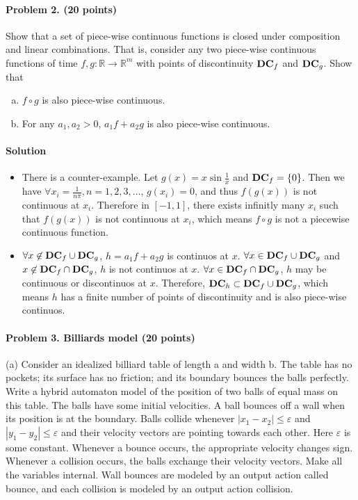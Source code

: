 \documentclass[11pt]{article}
\newcommand{\reals}[0]{\mathbb{R}}
\begin{document}
\paragraph{Problem 2. (20 points)}
Show that a set of piece-wise continuous functions is closed under composition and linear combinations. That is, consider any two piece-wise continuous functions of time $f, g: \reals \rightarrow \reals^m$ with points of discontinuity ${\bf DC}_f$ and ${\bf DC}_g$. Show that
\begin{enumerate}[(a)]
\item $f \circ g$ is also piece-wise continuous.
\item For any $a_1, a_2 >0$, $a_1  f + a_2 g$ is also piece-wise continuous.
\end{enumerate}

\paragraph{Solution}
\begin{itemize}[(a)]
\item
There is a counter-example. Let $g(x) = x \sin \frac{1}{x}$ and ${\bf DC}_f = \{0\}$. Then we have $\forall x_i = \frac{1}{n\pi}, n = 1,2,3,\ldots$, $g(x_i) = 0$, and thus $f(g(x))$ is not continuous at $x_i$. Therefore in $[-1, 1]$, there exists infinitly many $x_i$ such that $f(g(x))$ is not continuous at $x_i$, which means $f \circ g$ is not a piecewise continuous function.
\item
$\forall x \not\in {\bf DC}_f \cup {\bf DC}_g$, $h = a_1  f + a_2 g$ is continuos at $x$. $\forall x \in {\bf DC}_f \cup {\bf DC}_g$ and $x \not\in {\bf DC}_f \cap {\bf DC}_g$, $h$ is not continuos at $x$. $\forall x \in {\bf DC}_f \cap {\bf DC}_g$, $h$ may be continuous or discontinuos at $x$. Therefore, ${\bf DC}_h \subset {\bf DC}_f \cup {\bf DC}_g$, which means $h$ has a finite number of points of discontinuity and is also piece-wise continuos.
\end{itemize}

\paragraph{Problem 3. Billiards model (20 points)}
(a) Consider an idealized billiard table of length a and width b. The table has no pockets; its surface has no friction; and its boundary bounces the balls perfectly. Write a hybrid automaton model of the position of two balls of equal mass on this table. The balls have some initial velocities. A ball bounces off a wall when its position is at the boundary. Balls collide whenever $|x_1-x_2|\leq\varepsilon$ and $|y_1-y_2| \leq \varepsilon$ and their velocity vectors are pointing towards each other. Here $\varepsilon$ is some constant. Whenever a bounce occurs, the appropriate velocity changes sign. Whenever a collision occurs, the balls exchange their velocity vectors. Make all the variables internal. Wall bounces are modeled by an output action called bounce, and each collision is modeled by an output action collision.
\end{document}
